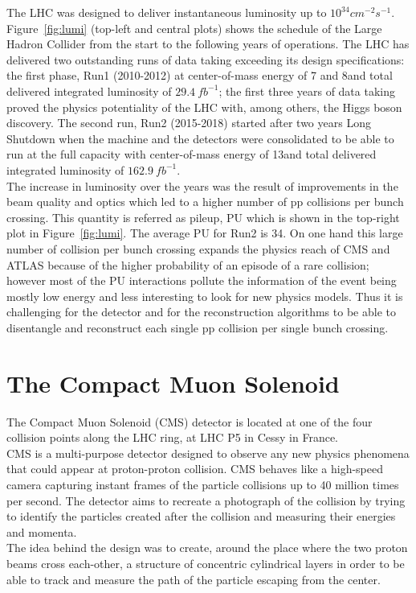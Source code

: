 The LHC was designed to deliver instantaneous luminosity up to $10^{34}cm^{-2}s^{-1}$.\\
Figure~\ref{fig:lumi} (top-left and central
plots) shows the schedule of the Large Hadron Collider from the start
to the following years of operations. The LHC has delivered two
outstanding runs of data taking exceeding its design specifications: the first phase, Run1 (2010-2012) at
center-of-mass energy of 7 and 8\TeV and total delivered integrated
luminosity of $29.4\ fb^{-1}$; the first three years of data taking proved
the physics potentiality of the LHC with, among others, the Higgs boson
discovery. The second run, Run2 (2015-2018) started after two years Long
Shutdown when the machine and the detectors were 
consolidated to be able to run at the full capacity with 
center-of-mass energy of 13\TeV and total delivered integrated
luminosity of $162.9\ fb^{-1}$.\\
The increase in luminosity over the
years was the result of improvements in the beam quality and optics which
led to a higher number of pp collisions per bunch crossing. This
quantity is referred as pileup, PU which is shown in the top-right plot
in Figure~\ref{fig:lumi}. The average \textlangle{}PU\textrangle{} for
Run2 is 34. On one hand this large
number of collision per bunch crossing 
expands the physics reach of CMS and ATLAS because of
the higher probability of an episode of a rare collision; however
most of the PU interactions pollute the information of the
event being mostly low energy and less interesting to look for
new physics models. Thus it is challenging for the detector and for
the reconstruction algorithms to be able 
to disentangle and reconstruct each single pp collision per single
bunch crossing.

\section{The Compact Muon Solenoid}\label{cms}

The Compact Muon Solenoid (CMS) detector is located at one of the four
collision points along the LHC ring, at LHC P5 in Cessy in
France.  \\
CMS is a multi-purpose detector designed to observe any new physics
phenomena that could appear at proton-proton collision. CMS behaves
like a high-speed camera capturing instant frames of the particle
collisions up to 40 million times per second. The detector aims to recreate a
photograph of the collision by trying to
identify the particles created after the collision and
measuring their energies and momenta. \\
The idea behind the design was to create, around the place where the
two proton beams cross each-other, a structure of concentric cylindrical layers
in order to be able to track and measure the path of the particle
escaping from the center.   

